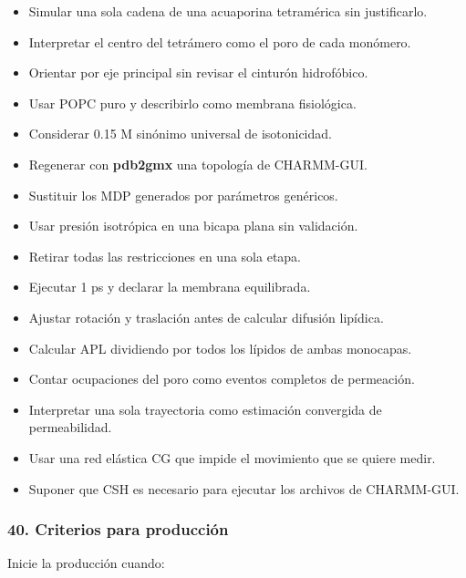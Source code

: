 \documentclass[
  spanish,
  11pt,
  a4paper]{article}
\providecommand{\tightlist}{%
  \setlength{\itemsep}{0pt}\setlength{\parskip}{0pt}}
\begin{document}
\begin{itemize}
\tightlist
\item
  Simular una sola cadena de una acuaporina tetramérica sin
  justificarlo.
\item
  Interpretar el centro del tetrámero como el poro de cada monómero.
\item
  Orientar por eje principal sin revisar el cinturón hidrofóbico.
\item
  Usar POPC puro y describirlo como membrana fisiológica.
\item
  Considerar 0.15 M sinónimo universal de isotonicidad.
\item
  Regenerar con \textbf{pdb2gmx} una topología de CHARMM-GUI.
\item
  Sustituir los MDP generados por parámetros genéricos.
\item
  Usar presión isotrópica en una bicapa plana sin validación.
\item
  Retirar todas las restricciones en una sola etapa.
\item
  Ejecutar 1 ps y declarar la membrana equilibrada.
\item
  Ajustar rotación y traslación antes de calcular difusión lipídica.
\item
  Calcular APL dividiendo por todos los lípidos de ambas monocapas.
\item
  Contar ocupaciones del poro como eventos completos de permeación.
\item
  Interpretar una sola trayectoria como estimación convergida de
  permeabilidad.
\item
  Usar una red elástica CG que impide el movimiento que se quiere medir.
\item
  Suponer que CSH es necesario para ejecutar los archivos de CHARMM-GUI.
\end{itemize}

\subsubsection{40. Criterios para
producción}\label{criterios-para-producciuxf3n}

Inicie la producción cuando:
\end{document}
